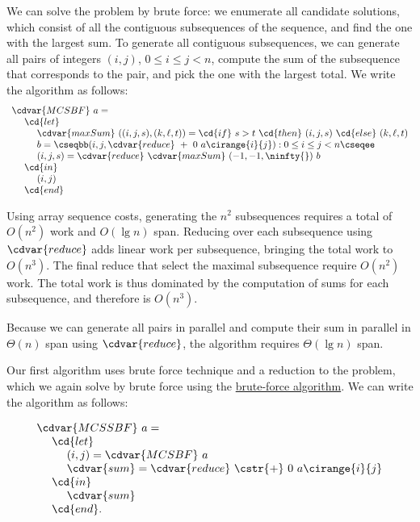 \begin{algorithm}
\label{alg:mcss::bf-alg::mcs}
We can solve the \MCS{} problem by brute force: we enumerate all
candidate solutions, which consist of all the contiguous subsequences
of the sequence, and find the one with the largest sum.
%
To generate all contiguous subsequences, we can generate all pairs of
integers $(i,j)$, $0 \le i \le j < n$, compute the sum of the
subsequence that corresponds to the pair, and pick the  one with the
largest total.  We write the algorithm as follows:
%
\[
\begin{array}{l}
\cdvar{MCSBF}~a =
\\
~~~~\cd{let} 
\\
~~~~~~~~\cdvar{maxSum}~((i, j, s), (k, \ell, t)) = \cd{if}~s > t~\cd{then}~(i, j, s)~\cd{else}~(k, \ell, t) 
\\
~~~~~~~~b = \cseqbb (i, j, \cdvar{reduce}~+~0~a\cirange{i}{j})  : 0  \le i \le j < n \cseqee
\\
~~~~~~~~(i, j, s) = \cdvar{reduce}~\cdvar{maxSum}~(-1, -1, \ninfty{})~b
\\
~~~~\cd{in}
\\
~~~~~~~~(i, j)
\\
~~~~\cd{end}
\end{array}
\]

\end{algorithm}

\begin{gram}
Using array sequence costs, generating the $n^2$ subsequences requires
a total of $O(n^2)$ work and $O(\lg{n})$ span.
%
Reducing over each subsequence using $\cdvar{reduce}$ adds linear work
per subsequence, bringing the total work to $O(n^3)$. 
%
The final reduce that select the maximal subsequence require $O(n^2)$
work.
%
The total work is thus dominated by the computation of sums for each
subsequence, and therefore is $O(n^3)$.

Because we can generate all pairs in parallel and compute their sum in
parallel in $\Theta(n)$ span using $\cdvar{reduce}$, the algorithm
requires $\Theta(\lg{n})$ span.
\end{gram}


\begin{algorithm}
\label{alg:mcss::bf-alg::mcss}

Our first algorithm uses brute force technique and a reduction to the
\MCS{} problem, which we again solve by brute force using the
\href{alg:mcss::bf-alg::mcs}{brute-force \MCS{} algorithm}.
%
We can write the algorithm as follows:

\[
\begin{array}{l}
\cdvar{MCSSBF}~a =
\\
~~~~\cd{let} 
\\
~~~~~~~~(i, j) =  \cdvar{MCSBF}~a
\\
~~~~~~~~\cdvar{sum} = \cdvar{reduce}~\cstr{+}~0~a\cirange{i}{j}
\\
~~~~\cd{in}
\\
~~~~~~~~\cdvar{sum}
\\
~~~~\cd{end}.
\end{array}
\]
\end{algorithm}


